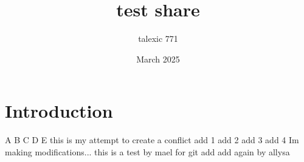 \documentclass{article}
\title{test share}
\author{talexic 771 }
\date{March 2025}
\begin{document}
\maketitle

\section{Introduction}
A
B
C
D
E
this is my attempt to create a conflict
add 1
add 2
add 3
add 4
Im making modifications... 
this is a test by mael for git
add
add again by allysa
\end{document}

